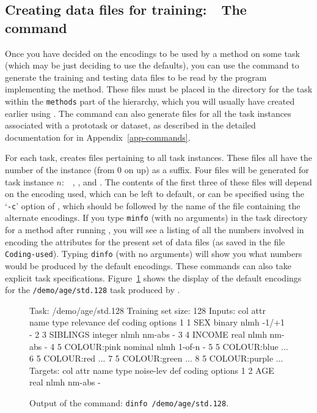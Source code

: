 \subsection{Creating data files for training:~~The \mgendata{}
            command}\label{assess-mgendata}

Once you have decided on the encodings to be used by a method on some
task (which may be just deciding to use the defaults), you can use the
\mgendata{} command to generate the training and testing data files to
be read by the program implementing the method.  These files must be
placed in the directory for the task within the \texttt{methods} part
of the \delve{} hierarchy, which you will usually have created earlier
using \mgendir{}.  The \mgendata{} command can also generate files for
all the task instances associated with a prototask or dataset, as
described in the detailed documentation for \mgendata{} in
Appendix~\ref{app-commands}.

For each task, \mgendata{} creates files pertaining to all task
instances.  These files all have the number of the instance (from 0 on
up) as a suffix.  Four files will be generated for task instance $n$:\
\ , ,  and
.  The contents of the first three of these files
will depend on the encoding used, which can be left to default, or can
be specified using the `\texttt{-c}' option of \mgendata{}, which
should be followed by the name of the file containing the alternate
encodings.  If you type \texttt{minfo} (with no arguments) in the task
directory for a method after running \mgendata{}, you will see a
listing of all the numbers involved in encoding the attributes for the
present set of data files (as saved in the file \texttt{Coding-used}).
Typing \texttt{dinfo} (with no arguments) will show you what numbers
would be produced by the default encodings.  These commands can also
take explicit task specifications. Figure~\ref{fig:dinfo-encoding}
shows the display of the default encodings for the
\texttt{/demo/age/std.128} task produced by \dinfo{}.

\begin{figure}[t]
\begin{Session}
Task: /demo/age/std.128
Training set size: 128
Inputs: 
 col attr name          type   relevance  def coding  options
   1   1  SEX           binary   nlmh       -1/+1        -
   2   3  SIBLINGS      integer  nlmh       nm-abs       -
   3   4  INCOME        real     nlmh       nm-abs       -
   4   5  COLOUR:pink   nominal  nlmh       1-of-n       -
   5   5  COLOUR:blue                  ...
   6   5  COLOUR:red                   ...
   7   5  COLOUR:green                 ...
   8   5  COLOUR:purple                ...
Targets: 
 col attr name          type   noise-lev  def coding  options
   1   2  AGE           real     nlmh       nm-abs       -
\end{Session}\vspace{-4pt}
\caption{Output of the command: \texttt{dinfo /demo/age/std.128}.}
\label{fig:dinfo-encoding}
\end{figure}

